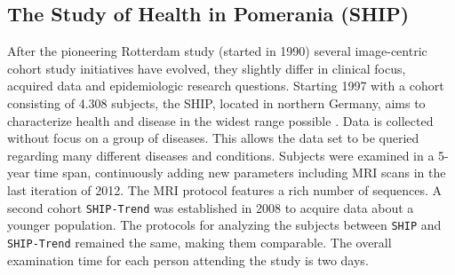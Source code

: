 \documentclass[journal]{style/vgtc} 			          %
\begin{document}


\subsection{The Study of Health in Pomerania (SHIP)}
After the pioneering Rotterdam study (started in 1990) several image-centric cohort study initiatives have evolved, they slightly differ in clinical focus, acquired data and epidemiologic research questions.
%
Starting 1997 with a cohort consisting of 4.308 subjects, the SHIP, located in northern Germany, aims to characterize health and disease in the widest range possible \cite{Volzke2011}.
%
Data is collected without focus on a group of diseases.
%
This allows the data set to be queried regarding many different diseases and conditions.
%
Subjects were examined in a 5-year time span, continuously adding new parameters including MRI scans in the last iteration of 2012.
%
The MRI protocol features a rich number of sequences.
%
%
A second cohort \texttt{SHIP-Trend} was established in 2008 to acquire data about a younger population.
%
The protocols for analyzing the subjects between \texttt{SHIP} and \texttt{SHIP-Trend} remained the same, making them comparable.
%
The overall examination time for each person attending the study is two days.
\end{document}
